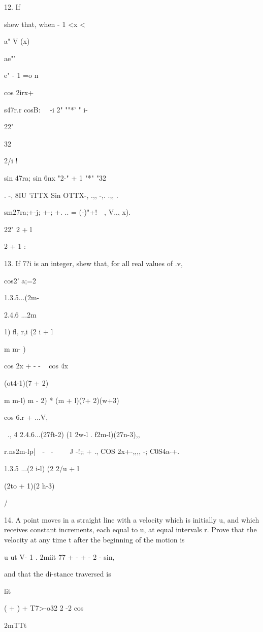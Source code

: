 12. If

shew that, when - 1 <x <\,

a" V (x)

ae"'

e" - 1 =o n

cos 2irx+

s47r.r cosB\pij: \ \ -i 2" ""*' " i-

22"

32

2/i !

sin 47ra; sin 6nx "2-" + 1 "*" "32

. -, 8IU 'iTTX Sin OTTX-, .,, -,. .,, .

sm27ra;+-j; +-; +. .. = (-)"+! \ \,, V,,, x).

22" 2 + l

2 + 1 :


13. If 7?i is an integer, shew that, for all real values of .v,

cos2' a;=2

1.3.5...(2m-

2.4.6 ...2m

1) fl, r,i (2 i + l

m m- )

cos 2x + - - ~ cos 4x

(ot4-1)(7 + 2)

m m-l) m - 2) * (m + l)(?\pi + 2)(w+3)

cos 6.r + ...V,

  \ ., 4 2.4.6...(27ft-2) (1 2w-l . f2m-l)(27n-3),,

r.ns2m-l\;p|\ \ - \ - \ \ \ \ J -!;; + ., COS 2x+-,,,, -;
C0S4a-+.

1.3.5 ...(2 i-l) (2 2/u + l

(2to + 1)(2 h-3)

/

14. A point moves in a straight line with a velocity which is
initially u, and which receives constant increments, each equal to u,
at equal intervals r. Prove that the velocity at any time t after the
beginning of the motion is

u ut V- 1 . 2miit 77 + - + - 2 - sin,

and that the di-stance traversed is

lit

( + ) + T7>-o32 2 -2 cos

2mTTt


